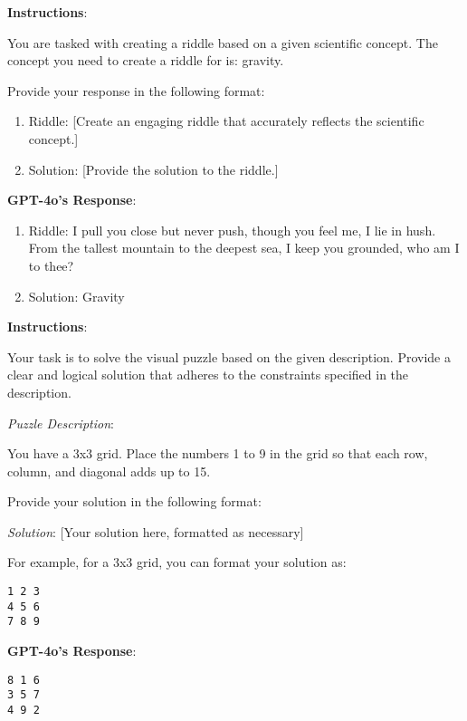 %
%
%
%
%
%
%
%
%
%
%
%

%

%
%
%
%
%
%
%
%
%
%
%
%
%

\begin{tcolorbox}[breakable,boxrule=0.5pt,sharp corners,fontupper=\small,
colback=green!10, colframe=green!50!black, title={Success: A Riddle for a Scientific Concept}]
\textbf{Instructions}:

You are tasked with creating a riddle based on a given scientific concept. The concept you need to create a riddle for is: gravity.

Provide your response in the following format:
\begin{enumerate}
    \item Riddle: [Create an engaging riddle that accurately reflects the scientific concept.]
    \item Solution: [Provide the solution to the riddle.]\\
\end{enumerate}

\textbf{GPT-4o's Response}:

\begin{enumerate}
    \item Riddle: I pull you close but never push, though you feel me, I lie in hush. From the tallest mountain to the deepest sea, I keep you grounded, who am I to thee?
    \item Solution: Gravity
\end{enumerate}
\end{tcolorbox}

\begin{tcolorbox}[breakable,boxrule=0.5pt,sharp corners,fontupper=\small,
colback=green!10, colframe=green!50!black, title={Success: Correct Magic Square Solution}]
\textbf{Instructions}:

Your task is to solve the visual puzzle based on the given description. Provide a clear and logical solution that adheres to the constraints specified in the description.

\textit{Puzzle Description}:

You have a 3x3 grid. Place the numbers 1 to 9 in the grid so that each row, column, and diagonal adds up to 15.

Provide your solution in the following format:

\textit{Solution}: [Your solution here, formatted as necessary]

For example, for a 3x3 grid, you can format your solution as:
\begin{verbatim}
1 2 3
4 5 6
7 8 9
\end{verbatim}

\textbf{GPT-4o's Response}:
\begin{verbatim}
8 1 6
3 5 7
4 9 2
\end{verbatim}

\end{tcolorbox}

